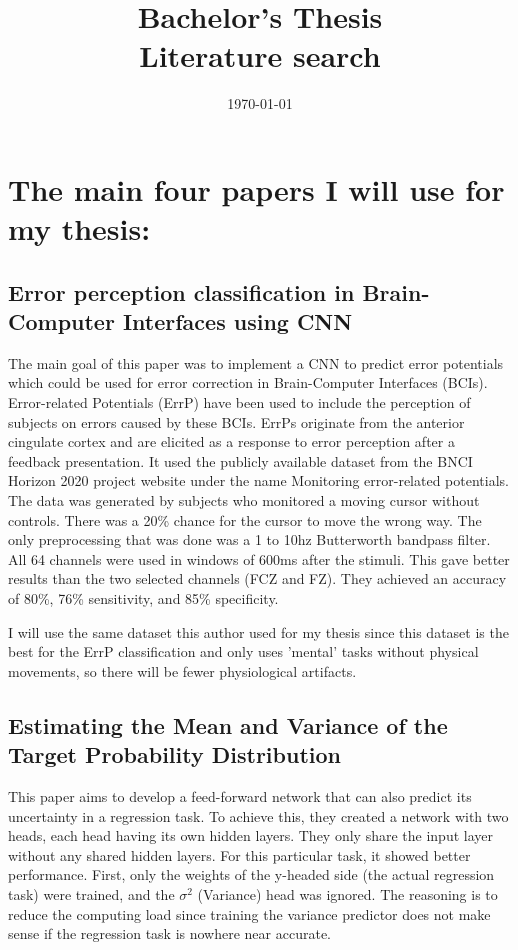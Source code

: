 \documentclass[10pt]{article}
\title{{\bf Bachelor's Thesis} \\ Literature search}
\author{}
\date{\today}
\begin{document}
\maketitle

\section*{The main four papers I will use for my thesis:}

\subsection*{Error perception classification in Brain-Computer Interfaces using CNN \cite{correia2021error}}

The main goal of this paper was to implement a CNN to predict error potentials which could be used for error correction in Brain-Computer Interfaces (BCIs). Error-related Potentials (ErrP) have been used to include the perception of subjects on errors caused by these BCIs. ErrPs originate from the anterior cingulate cortex and are elicited as a response to error perception after a feedback presentation. It used the publicly available dataset from the BNCI Horizon 2020 project website under the name Monitoring error-related potentials. The data was generated by subjects who monitored a moving cursor without controls. There was a 20\% chance for the cursor to move the wrong way. The only preprocessing that was done was a 1 to 10hz Butterworth bandpass filter. All 64 channels were used in windows of 600ms after the stimuli. This gave better results than the two selected channels (FCZ and FZ). They achieved an accuracy of 80\%, 76\% sensitivity, and 85\% specificity. 

I will use the same dataset this author used for my thesis since this dataset is the best for the ErrP classification and only uses 'mental' tasks without physical movements, so there will be fewer physiological artifacts.

\subsection*{Estimating the Mean and Variance of the Target Probability Distribution \cite{nix1994estimating}}
This paper aims to develop a feed-forward network that can also predict its uncertainty in a regression task. To achieve this, they created a network with two heads, each head having its own hidden layers. They only share the input layer without any shared hidden layers. For this particular task, it showed better performance. First, only the weights of the y-headed side (the actual regression task) were trained, and the $\sigma^2$ (Variance) head was ignored. The reasoning is to reduce the computing load since training the variance predictor does not make sense if the regression task is nowhere near accurate.
\end{document}
